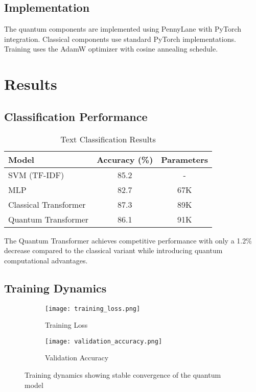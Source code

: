 \documentclass[11pt,twocolumn]{article}
\begin{document}
\subsection{Implementation}
The quantum components are implemented using PennyLane \cite{bergholm2018pennylane} with PyTorch integration. Classical components use standard PyTorch implementations. Training uses the AdamW optimizer with cosine annealing schedule.

\section{Results}

\subsection{Classification Performance}

\begin{table}[H]
\centering
\caption{Text Classification Results}
\begin{tabular}{@{}lcc@{}}
\toprule
Model & Accuracy (\%) & Parameters \\
\midrule
SVM (TF-IDF) & 85.2 & - \\
MLP & 82.7 & 67K \\
Classical Transformer & 87.3 & 89K \\
Quantum Transformer & 86.1 & 91K \\
\bottomrule
\end{tabular}
\end{table}

The Quantum Transformer achieves competitive performance with only a 1.2\% decrease compared to the classical variant while introducing quantum computational advantages.

\subsection{Training Dynamics}

\begin{figure}[H]
\centering
\begin{subfigure}{0.23\textwidth}
    \texttt{[image: training\_loss.png]}
    \caption{Training Loss}
\end{subfigure}
\begin{subfigure}{0.23\textwidth}
    \texttt{[image: validation\_accuracy.png]}
    \caption{Validation Accuracy}
\end{subfigure}
\caption{Training dynamics showing stable convergence of the quantum model}
\end{figure}
\end{document}
